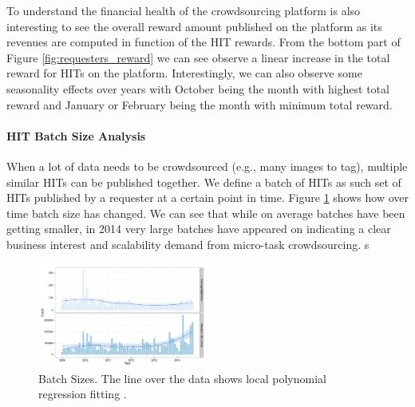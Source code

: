To understand the financial health of the crowdsourcing platform is also interesting to see the overall reward amount published on the platform as its revenues are computed in function of the HIT rewards. From the bottom part of Figure \ref{fig:requesters_reward} we can see observe a linear increase in the total reward for HITs on the platform. Interestingly, we can also observe some seasonality effects over years with October being the month with highest total reward and January or February being the month with minimum total reward.


\paragraph{HIT Batch Size Analysis}
When a lot of data needs to be crowdsourced (e.g., many images to tag), multiple similar HITs can be published together. We define a batch of HITs as such set of HITs published by a requester at a certain point in time. Figure \ref{fig:batch_size} shows how over time batch size has changed.
We can see that while on average batches have been getting smaller, in 2014 very large batches have appeared on \amt indicating a clear business interest and scalability demand from micro-task crowdsourcing.
s
\begin{figure}[htbp]
	\centering
		\includegraphics[width=0.5\textwidth]{figures/batch_size}
	\caption{Batch Sizes. The line over the data shows local polynomial regression fitting \cite{cleveland1992local}.}
	\label{fig:batch_size}
\end{figure}


